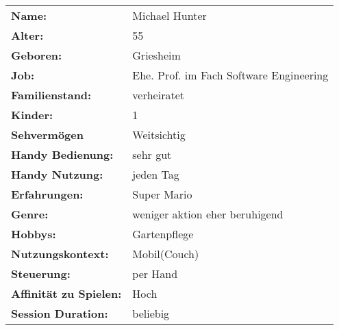 \documentclass[12pt, a4paper]{article}
\begin{document}
\par\bigskip

\begin{table}[H]
\begin{tabular}[h]{|l l|}
\hline
\textbf{Name:} & Michael Hunter\\
\textbf{Alter:} & 55\\
\textbf{Geboren:} & Griesheim\\
\textbf{Job:} & Ehe. Prof. im Fach Software Engineering\\
\textbf{Familienstand:} & verheiratet\\
\textbf{Kinder:} & 1\\
\textbf{Sehvermögen} & Weitsichtig\\
\textbf{Handy Bedienung:} & sehr gut\\
\textbf{Handy Nutzung:} & jeden Tag\\
\textbf{Erfahrungen:} & Super Mario\\
\textbf{Genre:} & weniger aktion eher beruhigend\\
\textbf{Hobbys:} & Gartenpflege\\
\textbf{Nutzungskontext:} & Mobil(Couch)\\
\textbf{Steuerung:} & per Hand\\
\textbf{Affinität zu Spielen:} & Hoch\\
\textbf{Session Duration:} & beliebig\\
\hline
\end{tabular}
\end{table}

\newpage
\end{document}
